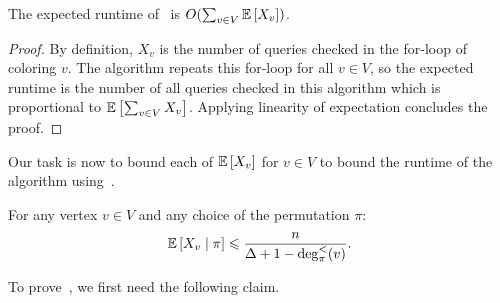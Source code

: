 \begin{observation}\label{obs:warmup-Xv}
	The expected runtime of~ is $O(\sum_{v \in V} \operatorname*{{\mathbb{E}}}\left[X_v\right])$. 
\end{observation}
\begin{proof}
	By definition, $X_v$ is the number of queries checked in the for-loop of coloring $v$. The algorithm repeats this for-loop for all $v \in V$, so the expected runtime is the number of all queries checked in this algorithm which is proportional to $\operatorname*{{\mathbb{E}}}\left[\sum_{v\in V} X_v\right]$. Applying linearity of expectation concludes the proof. 
\end{proof}

Our task is now to bound each of $\operatorname*{{\mathbb{E}}}\left[X_v\right]$ for $v \in V$ to bound the runtime of the algorithm using~. 

\begin{lemma}\label{lem:warmup-Xv-bound}
	For any vertex $v \in V$ and any choice of the permutation $\pi$:  
	\[
	\operatorname*{{\mathbb{E}}}\left[X_v \mid \pi\right] \leqslant \frac{n}{\Delta+1-\deg^{<}_{\pi}(v)}.
	\]
\end{lemma}

To prove~, we first need the following claim. 

